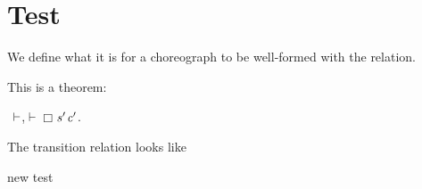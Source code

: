 \chapter{Test}

We define what it is for a choreograph to be well-formed with the  relation.

This is a theorem:
\begin{HOLmath}
\ensuremath{\HOLTokenTurnstile}\HOLConst{\ensuremath{\emptyset}},\HOLFreeVar{\ensuremath{\Theta}}\ensuremath{\vdash}\ensuremath{\Box}\;\HOLSymConst{\HOLTokenImp{}}\;\HOLSymConst{\HOLTokenExists{}}\HOLBoundVar{\ensuremath{\tau}}\;\;\ensuremath{\HOLBoundVar{s}\sp{\prime{}}}\;\ensuremath{\HOLBoundVar{c}\sp{\prime{}}}.\;\;\HOLSymConst{\HOLTokenDisj{}}\;\HOLSymConst{\HOLTokenNeg{}}\;
\end{HOLmath}

The transition relation looks like 

new test